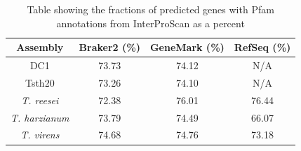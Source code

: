 \begin{table}[h!]
  \centering
  \begin{tabular}{|c|c|c|c|}
    \hline
    Assembly & Braker2 (\%) & GeneMark (\%) & RefSeq (\%) \\ \hline
    DC1 & 73.73 & 74.12 & N/A \\ \hline
    Tsth20 & 73.26 & 74.10 & N/A \\ \hline
    \textit{T. reesei} & 72.38 & 76.01 & 76.44 \\ \hline
    \textit{T. harzianum} & 73.79 & 74.49 & 66.07 \\ \hline
    \textit{T. virens} & 74.68 & 74.76 & 73.18 \\ \hline
  \end{tabular}
  \caption[InterProScan Pfam Evidence]{Table showing the fractions of predicted
    genes with Pfam annotations from InterProScan as a percent}
  \label{table:ips-pfam}
\end{table}



